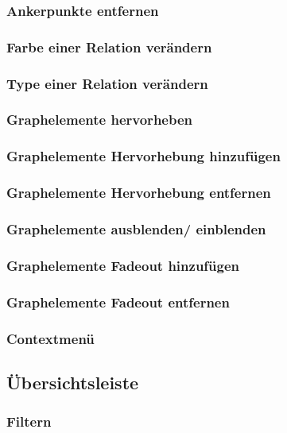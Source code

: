 \documentclass[enabledeprecatedfontcommands,fontsize=11pt,paper=a4,twoside]{scrartcl}
\begin{document}
		\subsubsection{Ankerpunkte entfernen}
		\subsubsection{Farbe einer Relation verändern}
		\subsubsection{Type einer Relation verändern}
		
		\subsubsection{Graphelemente hervorheben}
		\subsubsection{Graphelemente Hervorhebung hinzufügen}
		\subsubsection{Graphelemente Hervorhebung entfernen}
		
		\subsubsection{Graphelemente ausblenden/ einblenden}
		\subsubsection{Graphelemente Fadeout hinzufügen}
		\subsubsection{Graphelemente Fadeout entfernen}
		
		\subsubsection{Contextmenü}
	
	\subsection{Übersichtsleiste}
		\subsubsection{Filtern}
\end{document}
